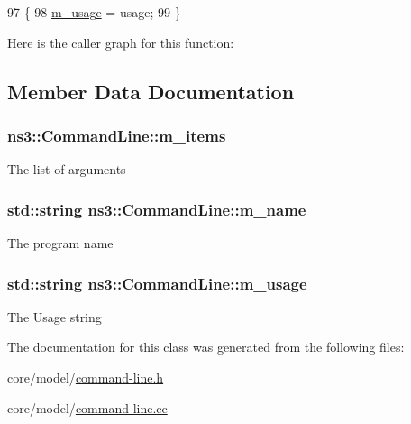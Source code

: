 \begin{DoxyCode}
97 \{
98   \hyperlink{classns3_1_1CommandLine_abf0e44700f8a5195206c692f38c7dcc6}{m\_usage} = usage;
99 \}
\end{DoxyCode}


Here is the caller graph for this function\+:




\subsection{Member Data Documentation}
\subsubsection[{\texorpdfstring{m\+\_\+items}{m_items}}]{ ns3\+::\+Command\+Line\+::m\+\_\+items\hspace{0.3cm}{\ttfamily [private]}}\hypertarget{classns3_1_1CommandLine_afe80ed73850cbfc83090bea2561df8be}{}\label{classns3_1_1CommandLine_afe80ed73850cbfc83090bea2561df8be}
The list of arguments 
\subsubsection[{\texorpdfstring{m\+\_\+name}{m_name}}]{\setlength{\rightskip}{0pt plus 5cm}std\+::string ns3\+::\+Command\+Line\+::m\+\_\+name\hspace{0.3cm}{\ttfamily [private]}}\hypertarget{classns3_1_1CommandLine_ab9d0d51a6dd793ae6488b6861c2655c1}{}\label{classns3_1_1CommandLine_ab9d0d51a6dd793ae6488b6861c2655c1}
The program name 
\subsubsection[{\texorpdfstring{m\+\_\+usage}{m_usage}}]{\setlength{\rightskip}{0pt plus 5cm}std\+::string ns3\+::\+Command\+Line\+::m\+\_\+usage\hspace{0.3cm}{\ttfamily [private]}}\hypertarget{classns3_1_1CommandLine_abf0e44700f8a5195206c692f38c7dcc6}{}\label{classns3_1_1CommandLine_abf0e44700f8a5195206c692f38c7dcc6}
The Usage string 

The documentation for this class was generated from the following files\+:\begin{DoxyCompactItemize}
\item 
core/model/\hyperlink{command-line_8h}{command-\/line.\+h}\item 
core/model/\hyperlink{command-line_8cc}{command-\/line.\+cc}\end{DoxyCompactItemize}
